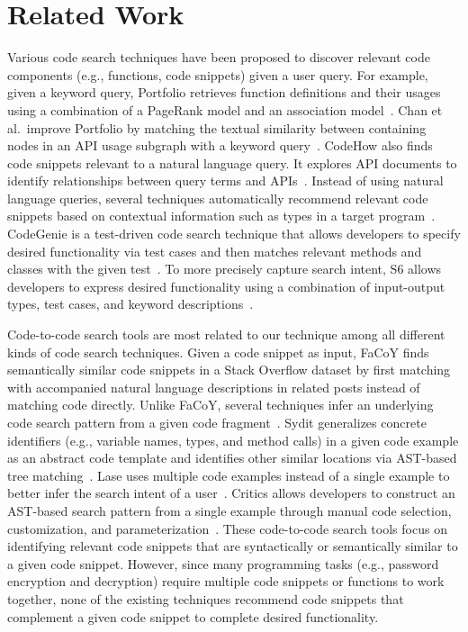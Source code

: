 \section{Related Work}
\label{sec:related}
Various code search techniques have been proposed to discover relevant code components (e.g., functions, code snippets) given a user query. For example, given a keyword query, Portfolio retrieves function definitions and their usages using a combination of a PageRank model and an association model~\cite{mcmillan2011portfolio}. Chan et al.~improve Portfolio by matching the textual similarity between containing nodes in an API usage subgraph with a keyword query~\cite{}. CodeHow also finds code snippets relevant to a natural language query. It explores API documents to identify relationships between query terms and APIs~\cite{lv2015codehow}. Instead of using natural language queries, several techniques automatically recommend relevant code snippets based on contextual information such as types in a target program~\cite{Holmes2005, sahavechaphan2006xsnippet, thummalapenta2007parseweb, ponzanelli2014mining}. CodeGenie is a test-driven code search technique that allows developers to specify desired functionality via test cases and then matches relevant methods and classes with the given test~\cite{lazzarini2009applying}. To more precisely capture search intent, S6 allows developers to express desired functionality using a combination of input-output types, test cases, and keyword descriptions~\cite{reiss2009semantics}.

Code-to-code search tools are most related to our technique among all different kinds of code search techniques. Given a code snippet as input, FaCoY finds semantically similar code snippets in a Stack Overflow dataset by first matching with accompanied natural language descriptions in related posts instead of matching code directly. Unlike FaCoY, several techniques infer an underlying code search pattern from a given code fragment~\cite{zhang2015interactive, MKM:11, meng2013lase, sivaraman2019active}. Sydit generalizes concrete identifiers (e.g., variable names, types, and method calls) in a given code example as an abstract code template and identifies other similar locations via AST-based tree matching~\cite{MKM:11}. Lase uses multiple code examples instead of a single example to better infer the search intent of a user~\cite{meng2013lase}. Critics allows developers to construct an AST-based search pattern from a single example through manual code selection, customization, and parameterization~\cite{zhang2015interactive}. These code-to-code search tools focus on identifying relevant code snippets that are syntactically or semantically similar to a given code snippet. However, since many programming tasks (e.g., password encryption and decryption) require multiple code snippets or functions to work together, none of the existing techniques recommend code snippets that complement a given code snippet to complete desired functionality.
